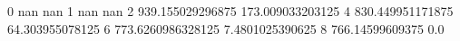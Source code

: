 0 nan nan
1 nan nan
2 939.155029296875 173.009033203125
4 830.449951171875 64.303955078125
6 773.6260986328125 7.4801025390625
8 766.14599609375 0.0

